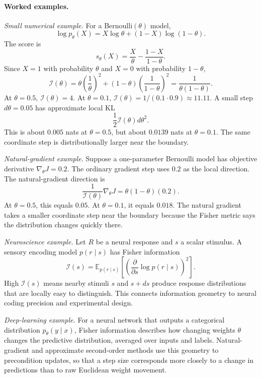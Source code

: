 \paragraph{Worked examples.}
\emph{Small numerical example.}
For a Bernoulli\((\theta)\) model,
\[
\log p_\theta(X)=X\log\theta+(1-X)\log(1-\theta).
\]
The score is
\[
s_\theta(X)=\frac{X}{\theta}-\frac{1-X}{1-\theta}.
\]
Since \(X=1\) with probability \(\theta\) and \(X=0\) with probability \(1-\theta\),
\[
\mathcal I(\theta)
=\theta\left(\frac{1}{\theta}\right)^2
+(1-\theta)\left(\frac{1}{1-\theta}\right)^2
=\frac{1}{\theta(1-\theta)}.
\]
At \(\theta=0.5\), \(\mathcal I(\theta)=4\). At \(\theta=0.1\), \(\mathcal I(\theta)=1/(0.1\cdot 0.9)\approx 11.11\). A small step \(d\theta=0.05\) has approximate local KL
\[
\frac12\mathcal I(\theta)d\theta^2.
\]
This is about \(0.005\) nats at \(\theta=0.5\), but about \(0.0139\) nats at \(\theta=0.1\). The same coordinate step is distributionally larger near the boundary.

\emph{Natural-gradient example.}
Suppose a one-parameter Bernoulli model has objective derivative \(\nabla_\theta J=0.2\). The ordinary gradient step uses \(0.2\) as the local direction. The natural-gradient direction is
\[
\frac{1}{\mathcal I(\theta)}\nabla_\theta J
=\theta(1-\theta)(0.2).
\]
At \(\theta=0.5\), this equals \(0.05\). At \(\theta=0.1\), it equals \(0.018\). The natural gradient takes a smaller coordinate step near the boundary because the Fisher metric says the distribution changes quickly there.

\emph{Neuroscience example.}
Let \(R\) be a neural response and \(s\) a scalar stimulus. A sensory encoding model \(p(r\mid s)\) has Fisher information
\[
\mathcal I(s)
=\mathbb E_{p(r\mid s)}
\left[
\left(\frac{\partial}{\partial s}\log p(r\mid s)\right)^2
\right].
\]
High \(\mathcal I(s)\) means nearby stimuli \(s\) and \(s+ds\) produce response distributions that are locally easy to distinguish. This connects information geometry to neural coding precision and experimental design.

\emph{Deep-learning example.}
For a neural network that outputs a categorical distribution \(p_\theta(y\mid x)\), Fisher information describes how changing weights \(\theta\) changes the predictive distribution, averaged over inputs and labels. Natural-gradient and approximate second-order methods use this geometry to precondition updates, so that a step size corresponds more closely to a change in predictions than to raw Euclidean weight movement.


